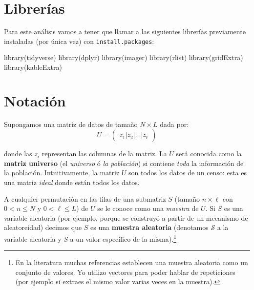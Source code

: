 \documentclass[
]{book}
\newenvironment{Shaded}{\begin{snugshade}}{\end{snugshade}}
\newcommand{\FunctionTok}[1]{\textcolor[rgb]{0.00,0.00,0.00}{#1}}
\newcommand{\NormalTok}[1]{#1}
\begin{document}
\hypertarget{libreruxedas-1}{%
\section{Librerías}\label{libreruxedas-1}}

Para este análisis vamos a tener que llamar a las siguientes librerías previamente instaladas (por única vez) con \texttt{install.packages}:

\begin{Shaded}
\begin{Highlighting}[]
\FunctionTok{library}\NormalTok{(tidyverse)}
\FunctionTok{library}\NormalTok{(dplyr)}
\FunctionTok{library}\NormalTok{(imager)}
\FunctionTok{library}\NormalTok{(rlist)}
\FunctionTok{library}\NormalTok{(gridExtra)}
\FunctionTok{library}\NormalTok{(kableExtra)}
\end{Highlighting}
\end{Shaded}

\hypertarget{notaciuxf3n}{%
\section{Notación}\label{notaciuxf3n}}

Supongamos una matriz de datos de tamaño \(N \times L\) dada por:
\[
U = \begin{pmatrix} 
z_1 \Big| z_2 \Big| \dots \Big| z_{\ell}
\end{pmatrix} 
\]

donde las \(z_i\) representan las columnas de la matriz. La \(U\) será conocida como la \textbf{matriz universo} (el \emph{universo} ó \emph{la población}) si contiene \emph{toda} la información de la población. Intuitivamente, la matriz \(U\) son todos los datos de un censo: esta es una matriz \emph{ideal} donde están todos los datos.

A cualquier permutación en las filas de una submatriz \(S\) (tamaño \(n \times \ell\) con \(0 < n \leq N\) y \(0 < \ell \leq L\)) de \(U\) se le conoce como una \emph{muestra} de \(U\). Si \(S\) es una variable aleatoria (por ejemplo, porque se construyó a partir de un mecanismo de aleatoreidad) decimos que \(S\) es una \textbf{muestra aleatoria} (denotamos \(\mathcal{S}\) a la variable aleatoria y \(S\) a un valor específico de la misma).\footnote{En la literatura muchas referencias establecen una muestra aleatoria como un conjunto de valores. Yo utilizo vectores para poder hablar de repeticiones (por ejemplo si extraes el mismo valor varias veces en la muestra).}
\end{document}
